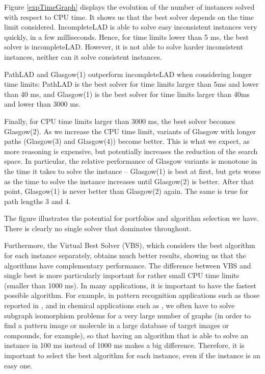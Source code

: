 \documentclass{llncs}
\begin{document}
Figure \ref{expTimeGraph} displays the evolution of the number of instances solved with respect to CPU time. It shows us that the best solver depends on the time limit
considered. IncompleteLAD is able to solve easy inconsistent instances very quickly, in a few milliseconds. Hence, for time limits lower than 5 ms, the best solver is incompleteLAD. However, it is not able to solve harder inconsistent instances, neither can it solve consistent instances. 

PathLAD and Glasgow(1) outperform incompleteLAD when considering longer time limits: PathLAD is the best solver for time limits larger than 5ms and lower than 40 ms, and Glasgow(1) is the best solver for time limits larger than 40ms and lower than 3000 ms.

Finally, for CPU time limits larger than 3000 ms, the best solver becomes Glasgow(2).
As we increase the CPU time limit, variants of Glasgow with longer paths (Glasgow(3) and Glasgow(4)) become better. This is what we expect, as more reasoning is expensive, but potentially increases the reduction of the search space. In particular, the relative performance of Glasgow variants is monotone in the time it takes to solve the instance – Glasgow(1) is best at first, but gets worse as the time to solve the instance increases until Glasgow(2) is better. After that point, Glasgow(1) is never better than Glasgow(2) again. The same is true for path lengths 3 and 4.

The figure illustrates the potential for portfolios and algorithm selection we have. There is clearly no single solver that dominates throughout.

Furthermore, the Virtual Best Solver (VBS), which considers the best algorithm for each instance
separately, obtains much better results, showing us that the algorithms have complementary
performance. The difference between VBS and single best is more particularly important for rather
small CPU time limits (smaller than 1000 ms). In many applications, it is important to have the
fastest possible algorithm. For example, in pattern recognition applications such as those reported
in \cite{pr15,cviu11}, and in chemical applications such as \cite{Giugno:2013}, we often have to
solve subgraph isomorphism problems for a very large number of graphs (in order to find a pattern
image or molecule in a large database of target images or compounds, for example), so that having an
algorithm that is able to solve an instance in 100 ms instead of 1000 ms makes a big difference.
Therefore, it is important to select the best algorithm for each instance, even if the instance is
an easy one.
\end{document}

